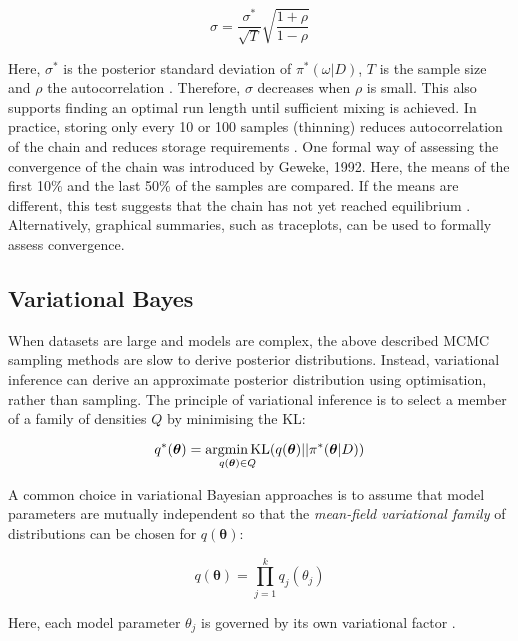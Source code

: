 \begin{equation}
\sigma=\frac{\sigma^*}{\sqrt{T}}\sqrt{\frac{1+\rho}{1-\rho}}
\end{equation}

Here, $\sigma^*$ is the posterior standard deviation of $\pi^*(\omega|D)$, $T$ is the sample size and $\rho$ the autocorrelation \citep{Tierney1991}. Therefore, $\sigma$ decreases when $\rho$ is small. This also supports finding an optimal run length until sufficient mixing is achieved. In practice, storing only every 10 or 100 samples (thinning) reduces autocorrelation of the chain and reduces storage requirements \citep{Greyer1992}. One formal way of assessing the convergence of the chain was introduced by Geweke, 1992. Here, the means of the first 10\% and the last 50\% of the samples are compared. If the means are different, this test suggests that the chain has not yet reached equilibrium \citep{Geweke1992}. Alternatively, graphical summaries, such as traceplots, can be used to formally assess convergence.

\subsection{Variational Bayes}

When datasets are large and models are complex, the above described MCMC sampling methods are slow to derive posterior distributions. Instead, variational inference can derive an approximate posterior distribution using optimisation, rather than sampling. The principle of variational inference is to select a member of a family of densities $Q$ by minimising the \gls{KL}:

\begin{equation}
q^\ast(\bm{\theta})=\underset{q(\bm{\theta})\in{}Q}{\textnormal{argmin\,{}KL}}(q(\bm{\theta})||\pi^*(\bm{\theta}|D))
\end{equation}

A common choice in variational Bayesian approaches is to assume that model parameters are mutually independent so that the \emph{mean-field variational family} of distributions can be chosen for $q(\bm{\theta})$:

\begin{equation}
q(\bm{\theta})=\prod_{j=1}^k{}q_j(\theta_j)
\end{equation}

Here, each model parameter $\theta_j$ is governed by its own variational factor \citep{Blei2017}.\\

